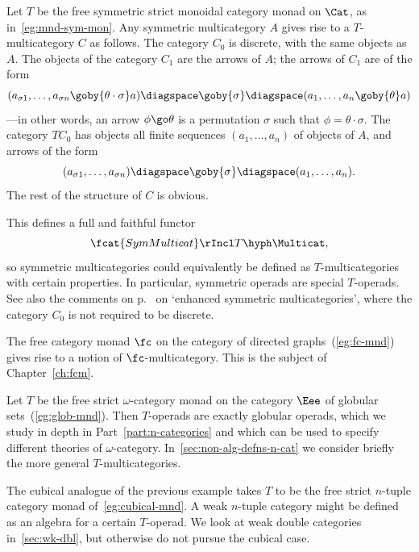 \begin{example}		%
%
%
Let $T$ be the free symmetric%
%
%
strict monoidal category monad on $\Cat$, as
in~\ref{eg:mnd-sym-mon}.  Any symmetric multicategory $A$ gives rise to a
$T$-multicategory $C$ as follows.  The category $C_0$ is discrete, with the
same objects as $A$.  The objects of the category $C_1$ are the arrows of
$A$; the arrows of $C_1$ are of the form
\[
(a_{\sigma 1}, \ldots, a_{\sigma n} \goby{\theta\cdot\sigma} a)
\diagspace
\goby{\sigma}
\diagspace
(a_1, \ldots, a_n \goby{\theta} a)
\]
---in other words, an arrow $\phi \go \theta$ is a permutation $\sigma$
such that $\phi = \theta\cdot\sigma$.  The category $TC_0$ has objects all
finite sequences $(a_1, \ldots, a_n)$ of objects of $A$, and arrows of the
form
\[
(a_{\sigma 1}, \ldots, a_{\sigma n})
\diagspace
\goby{\sigma}
\diagspace
(a_1, \ldots, a_n).
\]
The rest of the structure of $C$ is obvious. 

This defines a full and faithful functor
\[
\fcat{SymMulticat} \rIncl T\hyph\Multicat,
\]
so symmetric multicategories could equivalently be defined as
$T$-multicategories with certain properties.  In particular, symmetric
operads are special $T$-operads.  See also the comments on
p.~\pageref{p:enhanced} on `enhanced symmetric multicategories', where the
category $C_0$ is not required to be discrete.
\end{example}

\begin{example}	
The free category monad $\fc$ on the category of directed
graphs~(\ref{eg:fc-mnd}) gives rise to a notion of $\fc$-multicategory.%
%
%
This is the subject of Chapter~\ref{ch:fcm}. 
\end{example}

\begin{example}	
Let $T$ be the free strict $\omega$-category monad on the category $\Eee$
of globular sets~(\ref{eg:glob-mnd}).  Then $T$-operads are exactly
globular%
%
%
operads, which we
study in depth in Part~\ref{part:n-categories} and which can be used to
specify different theories of $\omega$-category.
In~\ref{sec:non-alg-defns-n-cat} we consider briefly the more general
$T$-multicategories.
\end{example}

\begin{example}%
%
%
The cubical analogue of the previous example takes $T$ to be the free
strict $n$-tuple category monad of~\ref{eg:cubical-mnd}.  A weak%
%
%
$n$-tuple
category might be defined as an algebra for a certain $T$-operad.  We look
at weak double categories in~\ref{sec:wk-dbl}, but otherwise do not pursue
the cubical case.
\end{example}

